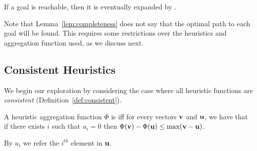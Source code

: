 \begin{lemma}[Completeness]
  \label{lem:completeness}
  If a goal is reachable, then it is eventually expanded by \kastar. 
\end{lemma}
Note that Lemma~\ref{lem:completeness} does not say that the optimal path to each goal will be found. This requires some restrictions over the heuristics and aggregation function used, as we discuss next. 

\subsection{Consistent Heuristics}

We begin our exploration by considering the case where all heuristic functions are \emph{consistent} (Definition~\ref{def:consistent}). 


\begin{definition}
A heuristic aggregation function $\Phi$ is \emph{\axiomcons} iff for every vectors $\mathbf{v}$ and $\mathbf{u}$, we have that if there exists $i$ such that  $u_i = 0$ then $\Phi(\mathbf{v}) - \Phi(\mathbf{u}) \leq \max (\mathbf{v}-\mathbf{u})$.
\end{definition}
By $u_i$ we refer the $i^{th}$ element in $\mathbf{u}$. 


